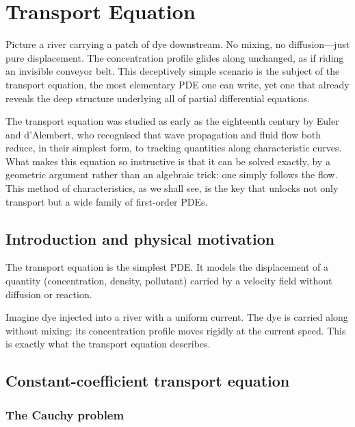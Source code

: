 \chapter{Transport Equation}
\label{ch:transport}

Picture a river carrying a patch of dye downstream. No mixing, no diffusion---just pure displacement. The concentration profile glides along unchanged, as if riding an invisible conveyor belt. This deceptively simple scenario is the subject of the transport equation, the most elementary PDE one can write, yet one that already reveals the deep structure underlying all of partial differential equations.

The transport equation was studied as early as the eighteenth century by Euler and d'Alembert, who recognised that wave propagation and fluid flow both reduce, in their simplest form, to tracking quantities along characteristic curves. What makes this equation so instructive is that it can be solved exactly, by a geometric argument rather than an algebraic trick: one simply follows the flow. This method of characteristics, as we shall see, is the key that unlocks not only transport but a wide family of first-order PDEs.

\section{Introduction and physical motivation}

The transport equation is the simplest PDE. It models the displacement of
a quantity (concentration, density, pollutant) carried by a velocity field
without diffusion or reaction.

\begin{intuition}
Imagine dye injected into a river with a uniform current. The dye is carried
along without mixing: its concentration profile moves rigidly at the
current speed. This is exactly what the transport equation describes.
\end{intuition}

\section{Constant-coefficient transport equation}

\subsection{The Cauchy problem}

